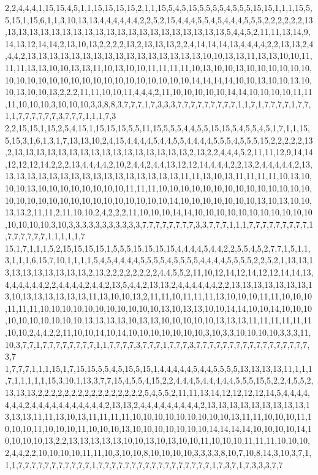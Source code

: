 2,2,4,4,4,1,15,15,4,5,1,1,15,15,15,15,2,1,1,15,5,4,5,15,5,5,5,5,4,5,5,5,15,15,1,1,1,15,5,5,15,1,15,6,1,1,3,10,13,13,4,4,4,4,4,4,2,2,5,2,15,4,4,4,5,5,4,5,4,4,4,5,5,5,2,2,2,2,2,2,13,13,13,13,13,13,13,13,13,13,13,13,13,13,13,13,13,13,13,13,13,5,4,4,5,2,11,11,13,14,9,14,13,12,14,14,2,13,10,13,2,2,2,2,13,2,13,13,13,2,2,4,14,14,14,13,4,4,4,4,2,2,13,13,2,4,4,4,2,13,13,13,13,13,13,13,13,13,13,13,13,13,13,13,13,10,10,13,13,11,13,13,10,10,11,11,11,13,13,10,10,13,13,11,10,13,10,10,11,11,11,11,10,13,10,10,13,10,10,10,10,10,10,10,10,10,10,10,10,10,10,10,10,10,10,10,10,10,10,10,14,14,14,14,10,10,13,10,10,13,10,10,13,10,10,13,2,2,2,11,11,10,10,11,4,4,4,2,11,10,10,10,10,10,14,14,10,10,10,10,11,11,11,10,10,10,3,10,10,10,3,3,8,8,3,7,7,7,1,7,3,3,3,7,7,7,7,7,7,7,7,7,1,1,7,1,7,7,7,7,1,7,7,1,1,7,7,7,7,7,7,3,7,7,7,1,1,1,7,3
2,2,15,15,1,15,2,5,4,15,1,15,15,15,5,5,11,15,5,5,5,4,4,5,5,15,15,5,4,5,5,4,5,1,7,1,1,15,5,15,3,1,6,1,3,1,7,13,13,10,2,4,15,4,4,4,4,5,4,4,5,5,4,4,4,4,5,5,5,4,5,5,5,15,2,2,2,2,2,13,2,13,13,13,13,13,13,13,13,13,13,13,13,13,13,13,13,2,13,2,2,4,4,4,5,2,11,11,12,9,14,14,12,12,12,14,2,2,2,13,4,4,4,4,2,10,2,4,4,2,4,4,13,12,12,14,4,4,4,2,2,13,2,4,4,4,4,4,2,13,13,13,13,13,13,13,13,13,13,13,13,13,13,13,13,13,11,11,13,10,13,11,11,11,11,10,13,10,10,10,13,10,10,10,10,10,10,10,10,11,11,11,10,10,10,10,10,10,10,10,10,10,10,10,10,10,10,10,10,10,10,10,10,10,10,10,10,10,10,10,10,14,10,10,10,10,10,10,10,13,10,13,10,10,13,13,2,11,11,2,11,10,10,2,4,2,2,2,11,10,10,10,14,14,10,10,10,10,10,10,10,10,10,10,10,10,10,10,10,3,10,3,3,3,3,3,3,3,3,3,3,3,7,7,7,7,7,7,7,7,3,3,7,7,7,1,1,1,7,7,7,7,7,7,7,7,7,1,7,7,7,7,7,7,1,1,1,1,1,7
15,1,7,1,1,1,5,2,15,15,15,15,1,5,5,5,15,15,15,15,4,4,4,4,5,4,4,2,2,5,5,4,5,2,7,7,1,5,1,1,3,1,1,1,6,15,7,10,1,1,1,1,5,4,5,4,4,4,4,5,5,5,5,4,5,5,5,5,4,4,4,4,5,5,5,5,2,2,5,2,1,13,13,13,13,13,13,13,13,13,13,2,13,2,2,2,2,2,2,2,2,4,4,5,5,2,11,10,12,14,12,14,12,12,14,14,13,4,4,4,4,4,4,2,2,4,4,4,4,2,4,4,2,13,5,4,4,2,13,13,2,4,4,4,4,4,4,2,2,13,13,13,13,13,13,13,13,10,13,13,13,13,13,13,11,13,10,10,13,2,11,11,10,11,11,11,13,10,10,10,11,11,10,10,10,11,11,11,10,10,10,10,10,10,10,10,10,10,10,13,10,13,13,10,10,14,14,10,10,14,10,10,10,10,10,10,10,10,10,10,13,13,13,13,10,13,13,10,10,10,10,10,13,13,13,11,11,11,11,11,11,10,10,2,4,4,2,2,11,10,10,14,10,14,10,10,10,10,10,10,10,3,10,3,3,10,10,10,10,3,3,3,11,10,3,7,7,1,7,7,7,7,7,7,7,7,1,1,7,7,7,7,3,7,7,7,1,7,7,7,3,7,7,7,7,7,7,7,7,7,7,7,7,7,7,7,7,7,3,7
1,7,7,7,1,1,1,15,1,7,15,15,5,5,4,5,15,5,15,1,4,4,4,4,4,5,4,4,5,5,5,5,13,13,13,13,11,1,1,1,7,1,1,1,1,1,15,3,10,1,13,3,7,7,15,4,5,5,4,15,2,2,4,4,4,5,4,4,4,4,4,5,5,5,15,5,2,2,4,5,5,2,13,13,13,2,2,2,2,2,2,2,2,2,2,2,2,2,2,2,2,5,4,5,5,2,11,11,13,14,12,12,12,12,14,5,4,4,4,4,4,4,4,2,4,4,4,4,4,4,4,4,4,4,4,2,13,13,2,4,4,4,4,4,4,4,4,4,2,13,13,13,13,13,13,13,13,13,13,13,13,11,11,13,10,13,11,11,11,11,10,10,10,10,10,10,10,10,10,13,11,11,10,10,10,11,10,10,10,11,10,10,10,11,10,10,10,13,10,10,10,10,10,10,10,14,14,14,14,10,10,10,10,14,10,10,10,10,13,2,2,13,13,13,13,13,10,10,13,10,13,10,10,11,10,10,10,11,11,11,10,10,10,2,4,4,2,2,10,10,10,10,11,11,10,3,10,10,8,10,10,10,10,3,3,3,3,8,10,7,10,8,14,3,10,3,7,1,1,1,7,7,7,7,7,7,7,7,7,7,7,1,7,7,7,7,7,7,7,7,7,7,7,7,7,7,7,7,7,1,7,3,7,1,7,3,3,3,7,7
